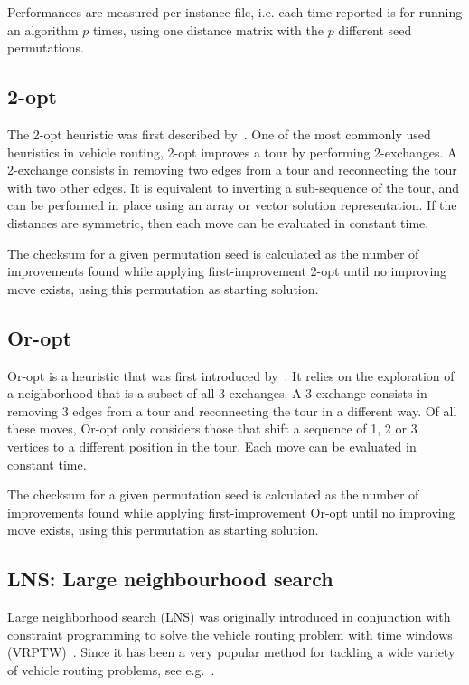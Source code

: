 \documentclass[11pt,a4paper,notitlepage]{article}
\begin{document}
Performances are measured per instance file, i.e. each time reported
is for running an algorithm $p$ times, using one distance matrix with the $p$
different seed permutations.

\subsection{2-opt}
The 2-opt heuristic was first described by~\cite{2-opt}.
One of the most commonly used heuristics in vehicle routing, 2-opt
improves a tour by performing 2-exchanges. A 2-exchange consists in
removing two edges from a tour and reconnecting the tour with two
other edges. It is equivalent to inverting a sub-sequence of the
tour, and can be performed in place using an array or vector solution
representation. If the distances are symmetric, then each move can be
evaluated in constant time. 

The checksum for a given permutation seed is calculated as the number of
improvements found while applying first-improvement 2-opt until no
improving move exists, using this permutation as starting solution.

\subsection{Or-opt}
Or-opt is a heuristic that was first introduced by~\cite{Or-opt}.
It relies on the exploration of a neighborhood that is a subset of all
3-exchanges. A 3-exchange consists in removing 3 edges from a tour and
reconnecting the tour in a different way. Of all these moves, Or-opt
only considers those that shift a sequence of 1, 2 or 3 vertices to a
different position in the tour. Each move can be evaluated in constant time. 

The checksum for a given permutation seed is calculated as the number of
improvements found while applying first-improvement Or-opt until no
improving move exists, using this permutation as starting solution.

\subsection{LNS: Large neighbourhood search}
Large neighborhood search (LNS) was originally introduced in
conjunction with constraint programming to solve the vehicle routing
problem with time windows (VRPTW)~\cite{lns}. Since it has been
a very popular method for tackling a wide variety of vehicle routing
problems, see e.g.~\cite{lnschapter}.
\end{document}
